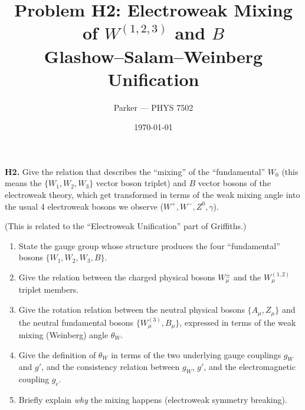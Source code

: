 \documentclass[11pt]{article}
\title{\bfseries Problem H2: Electroweak Mixing of $W^{(1,2,3)}$ and $B$ \\[2pt]
       \large Glashow--Salam--Weinberg Unification}
\author{Parker --- PHYS 7502}
\date{\today}
\begin{document}
\maketitle

\begin{problembox}
\textbf{H2.} Give the relation that describes the ``mixing'' of the ``fundamental''
$W_0$ (this means the $\{W_1,W_2,W_3\}$ vector boson triplet) and $B$ vector bosons
of the electroweak theory, which get transformed in terms of the weak mixing angle
into the usual 4 electroweak bosons we observe ($W^+, W^-, Z^0, \gamma$).

(This is related to the ``Electroweak Unification'' part of Griffiths.)
\end{problembox}

\begin{deliverbox}
\begin{enumerate}[leftmargin=*]
  \item State the gauge group whose structure produces the four ``fundamental'' bosons
        $\{W_1, W_2, W_3, B\}$.
  \item Give the relation between the charged physical bosons $W^{\pm}_\mu$ and the
        $W^{(1,2)}_\mu$ triplet members.
  \item Give the rotation relation between the neutral physical bosons $\{A_\mu,Z_\mu\}$
        and the neutral fundamental bosons $\{W^{(3)}_\mu, B_\mu\}$, expressed in terms
        of the weak mixing (Weinberg) angle $\theta_W$.
  \item Give the definition of $\theta_W$ in terms of the two underlying gauge couplings
        $g_W$ and $g'$, and the consistency relation between $g_W$, $g'$, and the
        electromagnetic coupling $g_e$.
  \item Briefly explain \emph{why} the mixing happens (electroweak symmetry breaking).
\end{enumerate}
\end{deliverbox}
\end{document}
